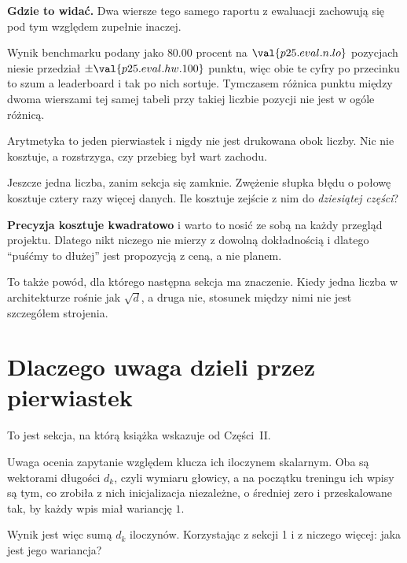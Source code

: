 \begin{fr}
\begin{aibox}
\textbf{Gdzie to widać.} Dwa wiersze tego samego raportu z ewaluacji zachowują
się pod tym względem zupełnie inaczej.

Wynik benchmarku podany jako $\num{80.00}$ procent na
$\val{p25.eval.n.lo}$ pozycjach niesie przedział $\pm\val{p25.eval.hw.100}$
punktu, więc obie te cyfry po przecinku to szum \dash{} a leaderboard i tak po
nich sortuje. Tymczasem różnica punktu między
dwoma wierszami tej samej tabeli przy takiej liczbie pozycji nie jest w ogóle
różnicą.

Arytmetyka to jeden pierwiastek i nigdy nie jest drukowana obok liczby. Nic nie
kosztuje, a rozstrzyga, czy przebieg był wart zachodu.
\end{aibox}

Jeszcze jedna liczba, zanim sekcja się zamknie. Zwężenie słupka błędu o połowę
kosztuje cztery razy więcej danych. Ile kosztuje zejście z nim do
\emph{dziesiątej części}?
\dotline
\nextframe
\end{fr}

\begin{fr}

\textbf{Precyzja kosztuje kwadratowo} i warto to nosić ze sobą na każdy przegląd
projektu. Dlatego nikt niczego nie mierzy z dowolną dokładnością i dlatego
\enquote{puśćmy to dłużej} jest propozycją z ceną, a nie planem.

To także powód, dla którego następna sekcja ma znaczenie. Kiedy jedna liczba w
architekturze rośnie jak $\sqrt{d}$, a druga nie, stosunek między nimi nie jest
szczegółem strojenia.
\end{fr}

\section{Dlaczego uwaga dzieli przez pierwiastek}
\label{sec:P25-attention}

\begin{fr}
To jest sekcja, na którą książka wskazuje od Części~II.

Uwaga ocenia zapytanie względem klucza ich iloczynem skalarnym. Oba są
wektorami długości $d_k$, czyli wymiaru głowicy, a na początku treningu ich
wpisy są tym, co zrobiła z nich inicjalizacja \dash{} niezależne, o średniej
zero i przeskalowane tak, by każdy wpis miał wariancję $1$.

Wynik jest więc sumą $d_k$ iloczynów. Korzystając z sekcji 1 i z niczego
więcej: jaka jest jego wariancja?
\dotline
\nextframe
\end{fr}

